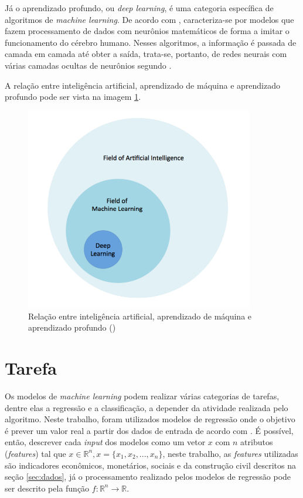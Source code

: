 Já o aprendizado profundo, ou \textit{deep learning}, é uma 
categoria específica de algoritmos de \textit{machine learning}. 
De acordo com \cite{deeplearningbook}, caracteriza-se por 
modelos que fazem processamento de dados com neurônios 
matemáticos de forma a imitar o 
funcionamento do cérebro humano. Nesses algoritmos, a informação
é passada de camada em camada até obter a saída, trata-se, portanto,
de redes neurais com várias camadas ocultas de neurônios 
segundo \cite{d2l}. 

A relação entre inteligência artificial, aprendizado de 
máquina e aprendizado profundo pode ser vista na 
imagem \ref{fig:ia_ml}.

\begin{figure}[H] 
  \includegraphics[width= 10cm]{../figuras/ia_ml.png}
  \caption{Relação entre inteligência artificial, aprendizado de máquina e aprendizado profundo (\cite{dl-oreilly})}
  \label{fig:ia_ml}
\end{figure}

\section{Tarefa}
 
Os modelos de \textit{machine learning} podem realizar várias categorias 
de tarefas, dentre elas a regressão e a classificação, a 
depender da atividade realizada pelo algoritmo.
Neste trabalho,  foram utilizados modelos de regressão onde o objetivo é prever um valor real a 
partir dos dados de entrada de acordo com \cite{Goodfellow-et-al-2016}.
É possível, então, descrever cada \textit{input} dos modelos como um vetor $x$ com 
$n$ atributos (\textit{features}) tal que
$x \in \mathbb{R}^n , x=\{x_1, x_2, ..., x_n\}$, neste trabalho, 
as \textit{features} utilizadas são indicadores econômicos, monetários,
sociais e da construção civil descritos na seção \ref{sec:dados}, já o 
processamento realizado pelos modelos de regressão pode ser descrito 
pela função $ f : \mathbb{R}^n \rightarrow \mathbb{R}$. 

